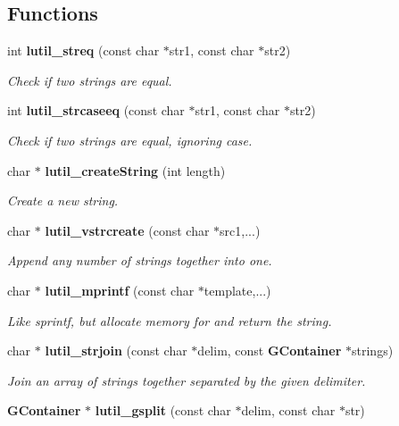 \subsection*{Functions}
\begin{CompactItemize}
\item 
int {\bf lutil\_\-streq} (const char $\ast$str1, const char $\ast$str2)
\begin{CompactList}\small\item\em Check if two strings are equal. \item\end{CompactList}\item 
int {\bf lutil\_\-strcaseeq} (const char $\ast$str1, const char $\ast$str2)
\begin{CompactList}\small\item\em Check if two strings are equal, ignoring case. \item\end{CompactList}\item 
char $\ast$ {\bf lutil\_\-create\-String} (int length)
\begin{CompactList}\small\item\em Create a new string. \item\end{CompactList}\item 
char $\ast$ {\bf lutil\_\-vstrcreate} (const char $\ast$src1,...)
\begin{CompactList}\small\item\em Append any number of strings together into one. \item\end{CompactList}\item 
char $\ast$ {\bf lutil\_\-mprintf} (const char $\ast$template,...)
\begin{CompactList}\small\item\em Like sprintf, but allocate memory for and return the string. \item\end{CompactList}\item 
char $\ast$ {\bf lutil\_\-strjoin} (const char $\ast$delim, const {\bf GContainer} $\ast$strings)
\begin{CompactList}\small\item\em Join an array of strings together separated by the given delimiter. \item\end{CompactList}\item 
{\bf GContainer} $\ast$ {\bf lutil\_\-gsplit} (const char $\ast$delim, const char $\ast$str)

\end{CompactItemize}
